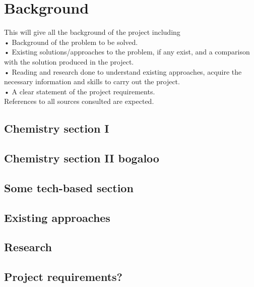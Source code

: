 \chapter{Background}
\label{ch:background}

This will give all the background of the project including\\
• Background of the problem to be solved.\\
• Existing solutions/approaches to the problem, if any exist, and a comparison
with the solution produced in the project.\\
• Reading and research done to understand existing approaches, acquire the
necessary information and skills to carry out the project.\\
• A clear statement of the project requirements.\\
References to all sources consulted are expected. \\

\section{Chemistry section I}
\section{Chemistry section II bogaloo}
\section{Some tech-based section}
\section{Existing approaches}
\section{Research}
\section{Project requirements?}